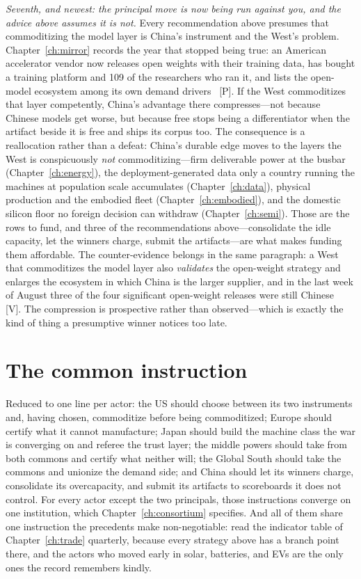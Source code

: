 \emph{Seventh, and newest: the principal move is now being run against you, and the advice above assumes it is not.} Every recommendation above presumes that commoditizing the model layer is China's instrument and the West's problem. Chapter~\ref{ch:mirror} records the year that stopped being true: an American accelerator vendor now releases open weights with their training data, has bought a training platform and 109 of the researchers who ran it, and lists the open-model ecosystem among its own demand drivers~\cite{nemotron,nvda-poolside,nvda-huang-q2} [P]. If the West commoditizes that layer competently, China's advantage there compresses---not because Chinese models get worse, but because free stops being a differentiator when the artifact beside it is free and ships its corpus too. The consequence is a reallocation rather than a defeat: China's durable edge moves to the layers the West is conspicuously \emph{not} commoditizing---firm deliverable power at the busbar (Chapter~\ref{ch:energy}), the deployment-generated data only a country running the machines at population scale accumulates (Chapter~\ref{ch:data}), physical production and the embodied fleet (Chapter~\ref{ch:embodied}), and the domestic silicon floor no foreign decision can withdraw (Chapter~\ref{ch:semi}). Those are the rows to fund, and three of the recommendations above---consolidate the idle capacity, let the winners charge, submit the artifacts---are what makes funding them affordable. The counter-evidence belongs in the same paragraph: a West that commoditizes the model layer also \emph{validates} the open-weight strategy and enlarges the ecosystem in which China is the larger supplier, and in the last week of August three of the four significant open-weight releases were still Chinese~\cite{hunyuan-hy4} [V]. The compression is prospective rather than observed---which is exactly the kind of thing a presumptive winner notices too late.

\section{The common instruction}

Reduced to one line per actor: the US should choose between its two instruments and, having chosen, commoditize before being commoditized; Europe should certify what it cannot manufacture; Japan should build the machine class the war is converging on and referee the trust layer; the middle powers should take from both commons and certify what neither will; the Global South should take the commons and unionize the demand side; and China should let its winners charge, consolidate its overcapacity, and submit its artifacts to scoreboards it does not control. For every actor except the two principals, those instructions converge on one institution, which Chapter~\ref{ch:consortium} specifies. And all of them share one instruction the precedents make non-negotiable: read the indicator table of Chapter~\ref{ch:trade} quarterly, because every strategy above has a branch point there, and the actors who moved early in solar, batteries, and EVs are the only ones the record remembers kindly.

